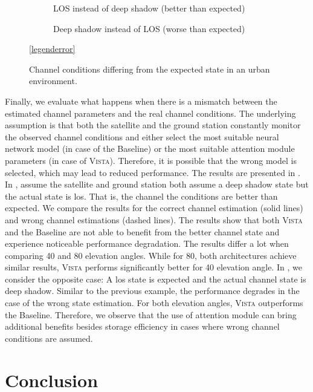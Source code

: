 \documentclass[conference]{IEEEtran}
\newcommand\ours{\textsc{Vista}\xspace}
\newcommand\baseline{Baseline\xspace}
\begin{document}
\begin{figure}[t!]
  \begin{subfigure}{.48\linewidth}
  \centering
  
  \caption{LOS instead of deep shadow (better than expected)}
  \label{fig:different_state_same_snr_better}
\end{subfigure}
\hfill
\begin{subfigure}{.48\linewidth}
  \centering
  
  \caption{Deep shadow instead of LOS (worse than expected)}
  \label{fig:different_state_same_snr_worse}
\end{subfigure}

\vspace{1em}
\centering
\ref{legenderror}

\caption{Channel conditions differing from the expected state in an urban environment.}
\label{fig:different_state_same_snr}
\end{figure}

Finally, we evaluate what happens when there is a mismatch between the estimated channel parameters and the real channel conditions. 
The underlying assumption is that both the satellite and the ground station constantly monitor the observed channel conditions and either select the most suitable neural network model (in case of the \baseline) or the most suitable attention module parameters (in case of \ours).
Therefore, it is possible that the wrong model is selected, which may lead to reduced performance.
The results are presented in .
In , assume the satellite and ground station both assume a deep shadow state but the actual state is \ac{los}. 
That is, the channel the conditions are better than expected. 
We compare the results for the correct channel estimation (solid lines) and wrong channel estimations (dashed lines).
The results show that both \ours and the \baseline are not able to benefit from the better channel state and experience noticeable performance degradation.
The results differ a lot when comparing 40\textdegree{} and 80\textdegree{} elevation angles.
While for 80\textdegree{}, both architectures achieve similar results, 
\ours performs significantly better for 40\textdegree{} elevation angle.
In , we consider the opposite case: 
A \ac{los} state is expected and the actual channel state is deep shadow. 
Similar to the previous example, the performance degrades in the case of the wrong state estimation.
For both elevation angles, \ours outperforms the \baseline.
Therefore, we observe that the use of attention module can bring additional benefits besides storage efficiency in cases where wrong channel conditions are assumed.

\section{Conclusion}
\label{sec:conclusion}



\end{document}
